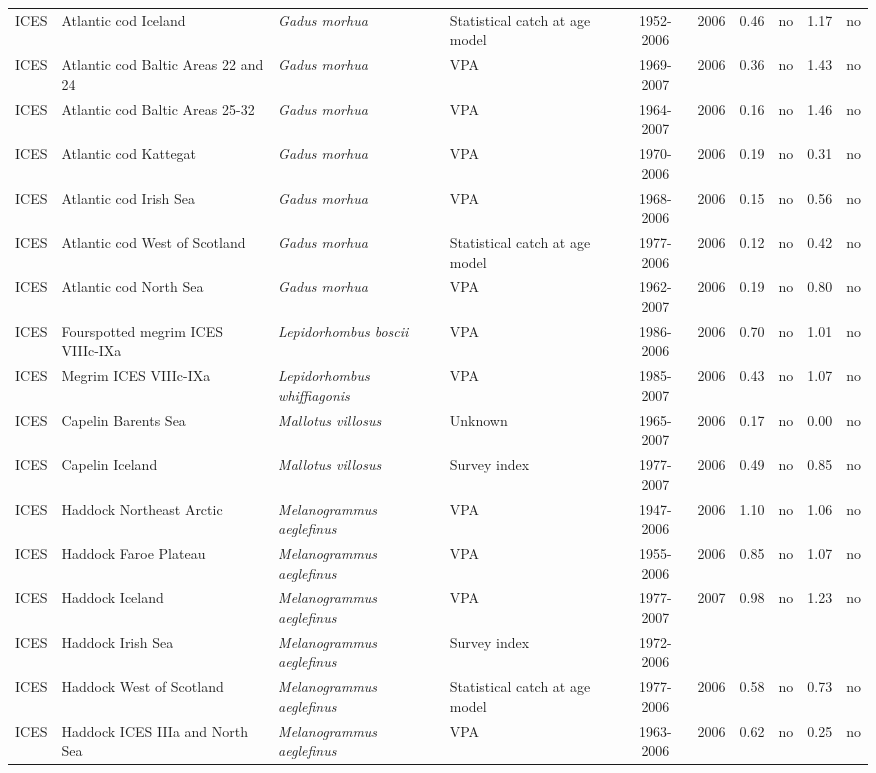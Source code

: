 \begin{longtable}{p{1.8cm}p{3.5cm}p{3.5cm}p{3cm}cccp{0.9cm}cp{0.9cm}}
  ICES & Atlantic cod Iceland & \textit{Gadus morhua} & Statistical catch at age model & 1952-2006 & 2006 & 0.46 & no & 1.17 & no \\ 
  ICES & Atlantic cod Baltic Areas 22 and 24 & \textit{Gadus morhua} & VPA & 1969-2007 & 2006 & 0.36 & no & 1.43 & no \\ 
  ICES & Atlantic cod Baltic Areas 25-32 & \textit{Gadus morhua} & VPA & 1964-2007 & 2006 & 0.16 & no & 1.46 & no \\ 
  ICES & Atlantic cod Kattegat & \textit{Gadus morhua} & VPA & 1970-2006 & 2006 & 0.19 & no & 0.31 & no \\ 
  ICES & Atlantic cod Irish Sea & \textit{Gadus morhua} & VPA & 1968-2006 & 2006 & 0.15 & no & 0.56 & no \\ 
  ICES & Atlantic cod West of Scotland & \textit{Gadus morhua} & Statistical catch at age model & 1977-2006 & 2006 & 0.12 & no & 0.42 & no \\ 
  ICES & Atlantic cod North Sea & \textit{Gadus morhua} & VPA & 1962-2007 & 2006 & 0.19 & no & 0.80 & no \\ 
  ICES & Fourspotted megrim ICES VIIIc-IXa & \textit{Lepidorhombus boscii} & VPA & 1986-2006 & 2006 & 0.70 & no & 1.01 & no \\ 
  ICES & Megrim ICES VIIIc-IXa & \textit{Lepidorhombus whiffiagonis} & VPA & 1985-2007 & 2006 & 0.43 & no & 1.07 & no \\ 
  ICES & Capelin Barents Sea & \textit{Mallotus villosus} & Unknown & 1965-2007 & 2006 & 0.17 & no & 0.00 & no \\ 
  ICES & Capelin Iceland & \textit{Mallotus villosus} & Survey index & 1977-2007 & 2006 & 0.49 & no & 0.85 & no \\ 
  ICES & Haddock Northeast Arctic & \textit{Melanogrammus aeglefinus} & VPA & 1947-2006 & 2006 & 1.10 & no & 1.06 & no \\ 
  ICES & Haddock Faroe Plateau & \textit{Melanogrammus aeglefinus} & VPA & 1955-2006 & 2006 & 0.85 & no & 1.07 & no \\ 
  ICES & Haddock Iceland & \textit{Melanogrammus aeglefinus} & VPA & 1977-2007 & 2007 & 0.98 & no & 1.23 & no \\ 
  ICES & Haddock Irish Sea & \textit{Melanogrammus aeglefinus} & Survey index & 1972-2006 &  &  &  &  &  \\ 
  ICES & Haddock West of Scotland & \textit{Melanogrammus aeglefinus} & Statistical catch at age model & 1977-2006 & 2006 & 0.58 & no & 0.73 & no \\ 
  ICES & Haddock ICES IIIa and North Sea & \textit{Melanogrammus aeglefinus} & VPA & 1963-2006 & 2006 & 0.62 & no & 0.25 & no \\ 

\end{longtable}
